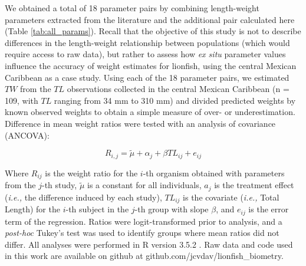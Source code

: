 \documentclass[fleqn,10pt,lineno]{wlpeerj} %
\begin{document}
We obtained a total of 18 parameter pairs by combining length-weight
parameters extracted from the literature and the additional pair
calculated here (Table \ref{tab:all_params}). Recall that the objective of
this study is not to describe differences in the length-weight
relationship between populations (which would require access to raw
data), but rather to assess how \emph{ex situ} parameter values
influence the accuracy of weight estimates for lionfish, using the
central Mexican Caribbean as a case study. Using each of the 18
parameter pairs, we estimated \(TW\) from the \(TL\) observations
collected in the central Mexican Caribbean (n = 109, with \(TL\) ranging
from 34 mm to 310 mm) and divided predicted weights by known observed
weights to obtain a simple measure of over- or underestimation.
Difference in mean weight ratios were tested with an analysis of
covariance (ANCOVA):

\begin{equation}
R_{i,j} = \tilde{\mu} + \alpha_j + \beta TL_{ij} + e_{ij}
\end{equation}

\clearpage

Where \(R_{ij}\) is the weight ratio for the \(i\)-th organism obtained
with parameters from the \(j\)-th study, \(\tilde{\mu}\) is a constant
for all individuals, \(a_j\) is the treatment effect (\emph{i.e.,} the
difference induced by each study), \(TL_{ij}\) is the covariate
(\emph{i.e.,} Total Length) for the \(i\)-th subject in the \(j\)-th
group with slope \(\beta\), and \(e_{ij}\) is the error term of the
regression. Ratios were logit-transformed prior to analysis, and a
\emph{post-hoc} Tukey's test was used to identify groups where mean
ratios did not differ. All analyses were performed in R version 3.5.2
\citep{rcore_2018}. Raw data and code used in this work are available on
github at github.com/jcvdav/lionfish\_biometry.
\end{document}
